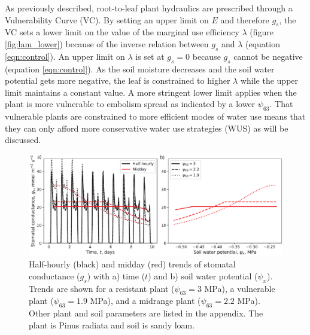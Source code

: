 \documentclass[utf8]{frontiersSCNS} %
\begin{document}
As previously described, root-to-leaf plant hydraulics are prescribed through a Vulnerability Curve (VC). By setting an upper limit on $E$ and therefore $g_s$, the VC sets a lower limit on the value of the marginal use efficiency $\lambda$ (figure \ref{fig:lam_lower}) because of the inverse relation between $g_s$ and $\lambda$ (equation \ref{eqn:control}). An upper limit on $\lambda$ is set at $g_s=0$ because $g_s$ cannot be negative (equation \ref{eqn:control}). As the soil moisture decreases and the soil water potential gets more negative, the leaf is constrained to higher $\lambda$ while the upper limit maintains a constant value. A more stringent lower limit applies when the plant is more vulnerable to embolism spread as indicated by a lower $\psi_{63}$. That vulnerable plants are constrained to more efficient modes of water use means that they can only afford more conservative water use strategies (WUS) as will be discussed.

\begin{figure}
    \begin{center}
         \includegraphics[scale=0.75]{Fig3.pdf}   
    \end{center}
    \caption{Half-hourly (black) and midday (red) trends of stomatal conductance ($g_s$) with a) time ($t$) and b) soil water potential ($\psi_x$). Trends are shown for a resistant plant ($\psi_{63} = 3$ MPa), a vulnerable plant ($\psi_{63} = 1.9$ MPa), and a midrange plant ($\psi_{63} = 2.2$ MPa). Other plant and soil parameters are listed in the appendix. The plant is Pinus radiata and soil is sandy loam.}
    \label{fig:resistant_vulnerable_gs}
\end{figure}
\end{document}
